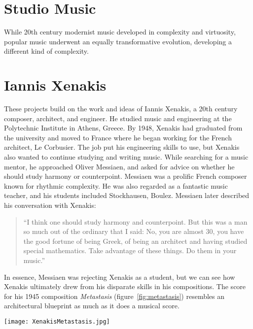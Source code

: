 


\section{Studio Music}
\label{sec:studio-music}
While 20th century modernist music developed in complexity and
virtuosity, popular music underwent an equally transformative
evolution, developing a different kind of complexity. 

\section{Iannis Xenakis}
\label{sec:iannis-xenakis}
These projects build on the work and ideas of Iannis Xenakis, a 20th
century composer, architect, and engineer. He studied music and
engineering at the Polytechnic Institute in Athens, Greece. By 1948,
Xenakis had graduated from the university and moved to France where he
began working for the French architect, Le Corbusier. The job put his
engineering skills to use, but Xenakis also wanted to continue
studying and writing music. While searching for a music mentor, he
approached Oliver Messiaen, and asked for advice on whether he should
study harmony or counterpoint. Messiaen was a prolific French composer
known for rhythmic complexity. He was also regarded as a fantastic
music teacher, and his students included Stockhausen, Boulez.
Messiaen later described his conversation with Xenakis:
\begin{quotation}``I think one should study harmony and
  counterpoint. But this was a man so much out of the ordinary that I
  said: No, you are almost 30, you have the good fortune of being
  Greek, of being an architect and having studied special
  mathematics. Take advantage of these things. Do them in your
  music.''\cite{Service2013}
\end{quotation}
In essence, Messiaen was rejecting Xenakis as a student, but we can
see how Xenakis ultimately drew from his disparate skills in his
compositions. The score for his 1945 composition \textit{Metastasis}
(figure~\ref{fig:metastasis}) resembles an architectural blueprint as
much as it does a musical score.

\begin{figure*}[h]
  \texttt{[image: XenakisMetastasis.jpg]}
  \caption{Excerpt from Iannis Xenakis' composition,
    \textit{Metastasis} (1954), measures 309-314. This score in this
    image was then transcribed to sheet music for the orchestral
    performance.}
  \label{fig:metastasis}
\end{figure*}

